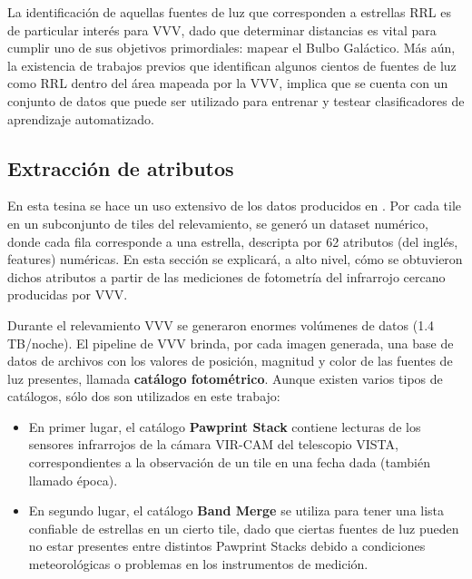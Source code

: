 \par La identificación de aquellas fuentes de luz que corresponden a estrellas RRL es de particular interés para VVV, dado que determinar distancias es vital para cumplir uno de sus objetivos primordiales: mapear el Bulbo Galáctico. Más aún, la existencia de trabajos previos \cite{gran1} \cite{gran2} que identifican algunos cientos de fuentes de luz como RRL dentro del área mapeada por la VVV, implica que se cuenta con un conjunto de datos que puede ser utilizado para entrenar y testear clasificadores de aprendizaje automatizado. 

\subsection{Extracción de atributos}

\par En esta tesina se hace un uso extensivo de los datos producidos en \cite{jbc}. Por cada tile en un subconjunto de tiles del relevamiento, se generó un dataset numérico, donde cada fila corresponde a una estrella, descripta por 62 atributos (del inglés, features) numéricas. En esta sección se explicará, a alto nivel, cómo se obtuvieron dichos atributos a partir de las mediciones de fotometría del infrarrojo cercano producidas por VVV. \\

\par Durante el relevamiento VVV se generaron enormes volúmenes de datos (1.4 TB/noche). El pipeline de VVV \cite{emerson} brinda, por cada imagen generada, una base de datos de archivos con los valores de posición, magnitud y color de las fuentes de luz presentes, llamada \textbf{catálogo fotométrico}. Aunque existen varios tipos de catálogos,  sólo dos son utilizados en este trabajo:

\begin{itemize}
\item En primer lugar, el catálogo \textbf{Pawprint Stack} contiene lecturas de los sensores infrarrojos de la cámara VIR-CAM del telescopio VISTA, correspondientes a la observación de un tile en una fecha dada (también llamado época). 
\item En segundo lugar, el catálogo \textbf{Band Merge} se utiliza para tener una lista confiable de estrellas en un cierto tile, dado que ciertas fuentes de luz pueden no estar presentes entre distintos Pawprint Stacks debido a condiciones meteorológicas o problemas en los instrumentos de medición.
\end{itemize}


